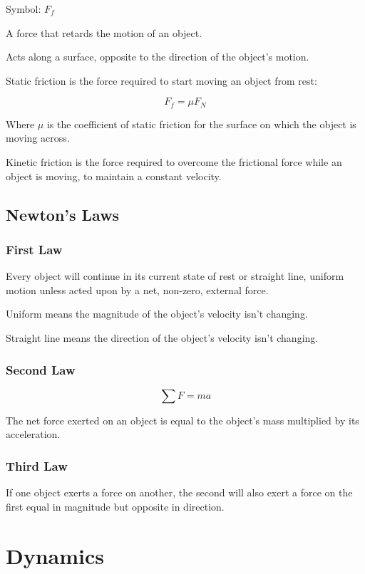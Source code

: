 \documentclass[a4paper,11pt]{article}
\begin{document}
Symbol: $F_f$

A force that retards the motion of an object.

Acts along a surface, opposite to the direction of the object's motion.

Static friction is the force required to start moving an object from rest:

$$
F_f = \mu F_N
$$

Where $\mu$ is the coefficient of static friction for the surface on which the
object is moving across.

Kinetic friction is the force required to overcome the frictional force while
an object is moving, to maintain a constant velocity.


\subsection{Newton's Laws}

\subsubsection{First Law}

Every object will continue in its current state of rest or straight line,
uniform motion unless acted upon by a net, non-zero, external force.

Uniform means the magnitude of the object's velocity isn't changing.

Straight line means the direction of the object's velocity isn't changing.


\subsubsection{Second Law}

$$
\sum F = ma
$$

The net force exerted on an object is equal to the object's mass multiplied by
its acceleration.


\subsubsection{Third Law}

If one object exerts a force on another, the second will also exert a force on
the first equal in magnitude but opposite in direction.




\section{Dynamics}
\end{document}
